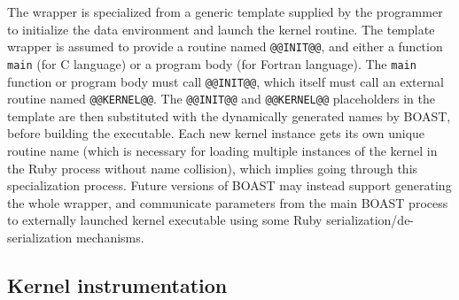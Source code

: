 \documentclass[11pt, a4paper, twoside]{montblanc2}
\begin{document}
The wrapper is specialized from a generic template supplied by
the programmer to initialize the data environment and launch the kernel
routine. The template wrapper is assumed to provide a routine named
\verb|@@INIT@@|, and either a function \texttt{main} (for C language) or a
program body (for Fortran language). The \texttt{main} function or program body
must call \verb|@@INIT@@|, which itself must call an external routine named
\verb|@@KERNEL@@|. The \verb|@@INIT@@| and \verb|@@KERNEL@@| placeholders in the 
template are then
substituted with the dynamically generated names by BOAST, before building the
executable. Each new kernel instance gets its own unique routine name (which is 
necessary for loading multiple instances of the kernel in the Ruby process 
without name collision), which implies going through this specialization 
process. Future versions of BOAST may instead support generating the whole 
wrapper, and communicate parameters from the main BOAST process to externally 
launched kernel executable using some Ruby serialization/de-serialization 
mechanisms.

\subsection{Kernel instrumentation}

\end{document}
